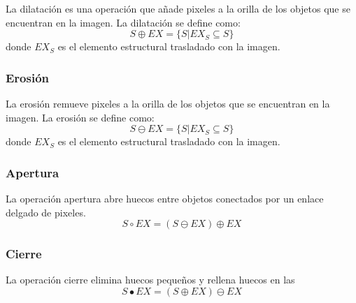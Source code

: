 La dilatación es una operación que añade pixeles a la orilla de los objetos que se encuentran en la imagen. La dilatación se define como:  
$$S \oplus EX = \lbrace S|EX_S \subseteq S \rbrace$$  
donde $EX_S$ es el elemento estructural trasladado con la imagen. 

\subsubsection{Erosión}\label{sssec:OMerosion}

La erosión remueve pixeles a la orilla de los objetos que se encuentran en la imagen. La erosión se define como: 
$$S \ominus EX = \lbrace S|EX_S \subseteq S \rbrace$$ 
donde $EX_S$ es el elemento estructural trasladado con la imagen. 

\subsubsection{Apertura}\label{sssec:Opening} 

La operación apertura abre huecos entre objetos conectados por un enlace delgado de pixeles.  
$$S \circ EX = (S \ominus EX) \oplus EX $$

\subsubsection{Cierre}\label{sssec:Closure}

La operación cierre elimina huecos pequeños  y rellena huecos en las
$$S \bullet EX = (S \oplus EX) \ominus EX $$

